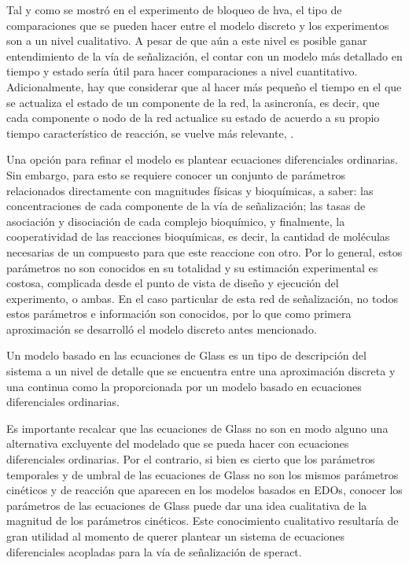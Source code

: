 Tal y como se mostró en el experimento de bloqueo de \ac{hva}, el tipo de comparaciones que se pueden hacer entre el modelo discreto y los experimentos son a un nivel cualitativo. A pesar de que aún a este nivel es posible ganar entendimiento de la vía de señalización, el contar con un modelo más detallado en tiempo y estado sería útil para hacer comparaciones a nivel cuantitativo.
Adicionalmente, hay que considerar que al hacer más pequeño el tiempo en el que se actualiza el estado de un componente de la red, la asincronía, es decir, que cada componente o nodo de la red actualice su estado de acuerdo a su propio tiempo característico de reacción, se vuelve más relevante, \citeauthor{Reka3Nodos2010} \citep{Reka3Nodos2010}.

Una opción para refinar el modelo es plantear ecuaciones diferenciales ordinarias. Sin embargo, para esto se requiere conocer un conjunto de parámetros relacionados directamente con magnitudes físicas y bioquímicas, a saber: las concentraciones de cada componente de la vía de señalización; las tasas de asociación y disociación de cada complejo bioquímico, y finalmente, la cooperatividad de las reacciones bioquímicas, es decir, la cantidad de moléculas necesarias de un compuesto para que este reaccione con otro. Por lo general, estos parámetros no son conocidos en su totalidad y su estimación experimental es costosa, complicada desde el punto de vista de diseño y ejecución del experimento, o ambas. En el caso particular de esta red de señalización, no todos estos parámetros e información son conocidos, por lo que como primera aproximación se desarrolló el modelo discreto antes mencionado.

Un modelo basado en las ecuaciones de Glass es un tipo de descripción del sistema a un nivel de detalle que se encuentra entre una aproximación discreta y una continua como la proporcionada por un modelo basado en ecuaciones diferenciales ordinarias.

Es importante recalcar que las ecuaciones de Glass no son en modo alguno una alternativa excluyente del modelado que se pueda hacer con ecuaciones diferenciales ordinarias. Por el contrario, si bien es cierto que los parámetros temporales y de umbral de las ecuaciones de Glass no son los mismos parámetros cinéticos y de reacción que aparecen en los modelos basados en \ac{EDOs}, conocer los parámetros de las ecuaciones de Glass puede dar una idea cualitativa de la magnitud de los parámetros cinéticos. Este conocimiento cualitativo resultaría de gran utilidad al momento de querer plantear un sistema de ecuaciones diferenciales acopladas para la vía de señalización de speract.


